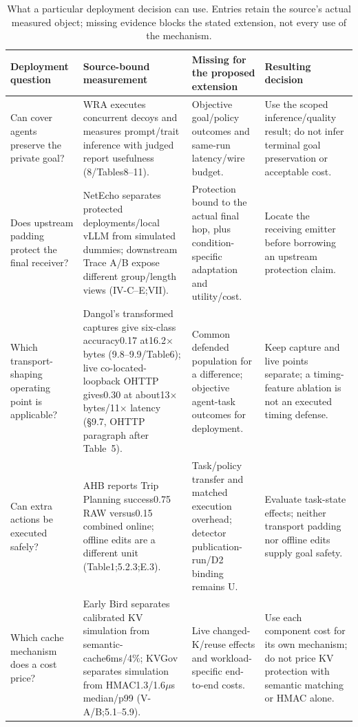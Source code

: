 \begin{table}[t]\centering\footnotesize
\caption{What a particular deployment decision can use. Entries retain the source's actual measured object; missing evidence blocks the stated extension, not every use of the mechanism.}\label{tab:deployment-decisions}
\begin{tabularx}{\textwidth}{@{}p{}p{}YY@{}}\toprule
Deployment question & Source-bound measurement & Missing for the proposed extension & Resulting decision\\\midrule
Can cover agents preserve the private goal? & WRA executes concurrent decoys and measures prompt/trait inference with judged report usefulness (8/Tables8--11). & Objective goal/policy outcomes and same-run latency/wire budget. & Use the scoped inference/quality result; do not infer terminal goal preservation or acceptable cost.\\
Does upstream padding protect the final receiver? & NetEcho separates protected deployments/local vLLM from simulated dummies; downstream Trace A/B expose different group/length views (IV-C--E;VII). & Protection bound to the actual final hop, plus condition-specific adaptation and utility/cost. & Locate the receiving emitter before borrowing an upstream protection claim.\\
Which transport-shaping operating point is applicable? & Dangol's transformed captures give six-class accuracy0.17 at16.2$\times$ bytes (9.8--9.9/Table6); live co-located-loopback OHTTP gives0.30 at about13$\times$ bytes/11$\times$ latency (\S9.7, OHTTP paragraph after Table~5). & Common defended population for a difference; objective agent-task outcomes for deployment. & Keep capture and live points separate; a timing-feature ablation is not an executed timing defense.\\
Can extra actions be executed safely? & AHB reports Trip Planning success0.75 RAW versus0.15 combined online; offline edits are a different unit (Table1;5.2.3;E.3). & Task/policy transfer and matched execution overhead; detector publication-run/D2 binding remains U. & Evaluate task-state effects; neither transport padding nor offline edits supply goal safety.\\
Which cache mechanism does a cost price? & Early Bird separates calibrated KV simulation from semantic-cache6ms/4\%; KVGov separates simulation from HMAC1.3/1.6$\mu$s median/p99 (V-A/B;5.1--5.9). & Live changed-K/reuse effects and workload-specific end-to-end costs. & Use each component cost for its own mechanism; do not price KV protection with semantic matching or HMAC alone.\\

\end{tabularx}
\end{table}

